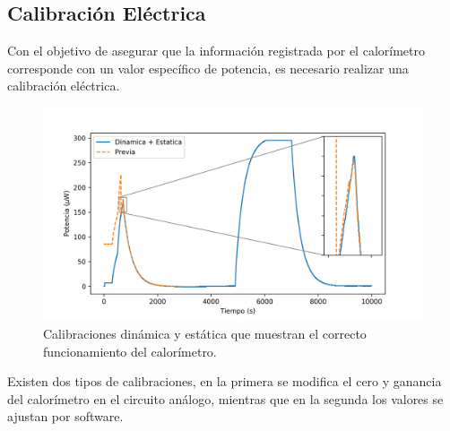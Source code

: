 \documentclass[a0]{sciposter}
\newcommand{\figwidth}{0.7\linewidth}
\begin{document}
\begin{multicols}{3}
\section{Calibraci\'on El\'ectrica}
	Con el objetivo de asegurar que la información registrada por el calorímetro corresponde con un valor específico de potencia, es necesario realizar una calibración eléctrica.
	\begin{figure}[h]
		\centering
		\includegraphics[width=\figwidth]{../Data/ElectricalCalibrations/Both}
		\caption{Calibraciones dinámica y estática que muestran el correcto funcionamiento del calorímetro.}
	\end{figure}

	Existen dos tipos de calibraciones, en la primera se modifica el cero y ganancia del calorímetro en el circuito análogo, mientras que en la segunda los valores se ajustan por software.


\end{multicols}
\end{document}
